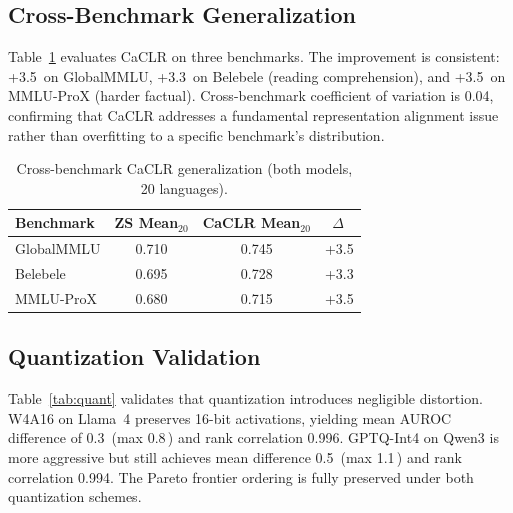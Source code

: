 \documentclass[11pt,a4paper]{article}
\newcommand{\pp}{\,\text{pp}}
\begin{document}
\subsection{Cross-Benchmark Generalization}
\label{sec:cross_benchmark}

Table~\ref{tab:cross_bench} evaluates CaCLR on three benchmarks. The improvement is consistent: +3.5\pp{} on GlobalMMLU, +3.3\pp{} on Belebele (reading comprehension), and +3.5\pp{} on MMLU-ProX (harder factual). Cross-benchmark coefficient of variation is 0.04, confirming that CaCLR addresses a fundamental representation alignment issue rather than overfitting to a specific benchmark's distribution.

\begin{table}[h]
\centering
\caption{Cross-benchmark CaCLR generalization (both models, 20 languages).}
\label{tab:cross_bench}
\small
\begin{tabular}{lccc}
\toprule
Benchmark & ZS Mean$_{20}$ & CaCLR Mean$_{20}$ & $\Delta$\pp \\
\midrule
GlobalMMLU & 0.710 & 0.745 & +3.5 \\
Belebele   & 0.695 & 0.728 & +3.3 \\
MMLU-ProX  & 0.680 & 0.715 & +3.5 \\
\bottomrule
\end{tabular}
\end{table}

\subsection{Quantization Validation}
\label{sec:quant}

Table~\ref{tab:quant} validates that quantization introduces negligible distortion. W4A16 on Llama~4 preserves 16-bit activations, yielding mean AUROC difference of 0.3\pp{} (max 0.8\pp) and rank correlation 0.996. GPTQ-Int4 on Qwen3 is more aggressive but still achieves mean difference 0.5\pp{} (max 1.1\pp) and rank correlation 0.994. The Pareto frontier ordering is fully preserved under both quantization schemes.
\end{document}
